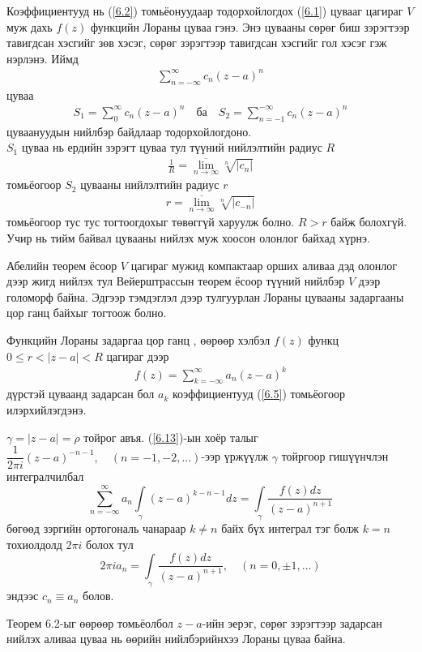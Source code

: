 \begin{dfn}
Коэффициентууд нь (\ref{6.2}) томьёонуудаар тодорхойлогдох (\ref{6.1}) цувааг цагираг $V$ муж дахь $f(z)$ функцийн Лораны цуваа гэнэ. Энэ цувааны сөрөг биш зэрэгтээр тавигдсан хэсгийг зөв хэсэг, сөрөг зэрэгтээр тавигдсан хэсгийг гол хэсэг  гэж нэрлэнэ. Иймд
\begin{eqnarray}
    \sum\limits_{n=-\infty}^\infty c_n(z-a)^ n
\end{eqnarray}
цуваа
\begin{eqnarray}
    S_1=\sum\limits_{0}^\infty c_n(z-a)^n \quad \text{ба} \quad S_2=\sum\limits_{n=-1}^{-\infty} c_n(z-a)^ n
\end{eqnarray}
цуваануудын нийлбэр байдлаар тодорхойлогдоно. \\
$S_1$ цуваа нь ердийн зэрэгт цуваа тул түүний нийлэлтийн радиус $R$
\begin{eqnarray}
    \frac{1}{R}=\overline{\lim\limits_{n\rightarrow \infty}} \sqrt[n]{|c_n|}
\end{eqnarray}
томьёогоор $S_2$ цувааны нийлэлтийн радиус $r$
\begin{eqnarray}
    r=\overline{\lim\limits_{n\rightarrow \infty}} \sqrt[n]{|c_{-n}|}
\end{eqnarray}
томьёогоор тус тус тогтоогдохыг төвөггүй харуулж болно. $R>r$ байж болохгүй. Учир нь тийм байвал цувааны нийлэх муж хоосон олонлог байхад хүрнэ.

Абелийн теорем ёсоор $V$ цагираг мужид компактаар орших аливаа дэд олонлог дээр жигд нийлэх тул Вейерштрассын теорем ёсоор түүний нийлбэр $V$ дээр голоморф байна. Эдгээр тэмдэглэл дээр тулгуурлан Лораны цувааны задаргааны цор ганц байхыг тогтоож болно.
\end{dfn}
\begin{thm} \label{Теорем 6.2}
Функцийн Лораны задаргаа цор ганц , өөрөөр хэлбэл $f(z)$ функц $0\leq r<|z-a|<R$ цагираг дээр 
\begin{eqnarray} \label{6.13}
    f(z)=\sum\limits_{k=-\infty}^\infty a_n(z-a)^ k
\end{eqnarray}
дүрстэй цуваанд задарсан бол $a_k$ коэффициентууд (\ref{6.5}) томьёогоор илэрхийлэгдэнэ.
\end{thm}
\begin{prf}
$\gamma =|z-a|=\rho$ тойрог авъя. (\ref{6.13})-ын хоёр талыг 
$\dfrac{1}{2\pi i}(z-a)^{-n-1}, \quad (n=-1,-2,\ldots)$-ээр үржүүлж $\gamma$ тойргоор гишүүнчлэн интегралчилбал 
$$\sum\limits_{n=-\infty}^\infty a_n \int\limits_\gamma (z-a)^{k-n-1}dz= \int\limits_\gamma \frac{f(z)dz}{(z-a)^{n+1}}$$
бөгөөд зэргийн ортогональ чанараар $k\neq n$ байх бүх интеграл тэг болж $k=n$ тохиолдолд $2\pi i$ болох тул
$$2\pi i a_n=\int\limits_\gamma  \frac{f(z)dz}{(z-a)^{n+1}}, \quad (n=0, \pm 1, \ldots)$$ эндээс $c_n\equiv a_n$ болов. 
 \end{prf}
Теорем 6.2-ыг өөрөөр томьёолбол $z-a$-ийн эерэг, сөрөг зэрэгтээр задарсан нийлэх аливаа цуваа нь өөрийн нийлбэрийнхээ Лораны цуваа байна.

